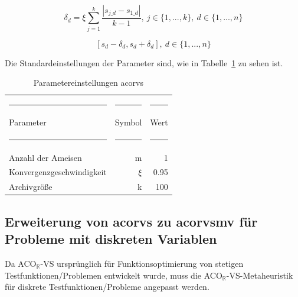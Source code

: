 \documentclass[fontsize=12, a4aper]{scrartcl}
\begin{document}
	\begin{equation} \label{subsec:ACO_R_-_very_-_simple:eq:Linear_Diviation}
		\delta_d = \xi\sum_{j=1}^{k} \frac{|s_{j\_d}-s_{1\_d}|}{k-1}, ~ j \in \{1, ..., k\}, ~ d \in \{1, ..., n\}
	\end{equation}
	
	\begin{equation} \label{subsec:ACO_R_-_very_-_simple:eq:interval}
		[s_d - \delta_d, s_d + \delta_d], ~ d \in \{1, ..., n\}
	\end{equation}
	
	\noindent Die Standardeinstellungen der Parameter sind, wie in Tabelle~\ref{ACO_R_very_simple_Parametereinstellungen} zu sehen ist.
	
	\begin{table}[H]
		\fontsize{10pt}{12pt}
		
		\caption{Parametereinstellungen \ac{acorvs}}
		\label{ACO_R_very_simple_Parametereinstellungen}
		
		\begin{tabularx}{\textwidth}{l|r|r}
			
			\rule{4.6cm}{0.4pt} & \rule{4.6cm}{0.4pt}& \rule{4.6cm}{0.4pt}\\
			
			Parameter & Symbol & Wert\\
			
			\rule{4.6cm}{0.4pt} & \rule{4.6cm}{0.4pt}& \rule{4.6cm}{0.4pt}\\
			
			Anzahl der Ameisen & m & 1\\
			Konvergenzgeschwindigkeit & \(\xi\) & 0.95\\
			Archivgröße & k & 100
			
			
		\end{tabularx}
		
	\end{table}
	
	\subsection{Erweiterung von \acl{acorvs} zu \acl{acorvsmv} für Probleme mit diskreten Variablen}
	
	Da ACO\(_\mathbb{R}\)-VS ursprünglich für Funktionsoptimierung von stetigen Testfunktionen/Problemen entwickelt wurde, muss die ACO\(_\mathbb{R}\)-VS-Metaheuristik für diskrete Testfunktionen/Probleme angepasst werden.\hfill\newline
	
\end{document}
